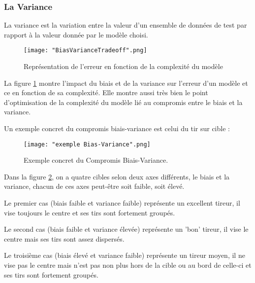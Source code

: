 \documentclass[a4paper]{article}
\begin{document}
\subsubsection{La Variance}

La variance est la variation entre la valeur d'un ensemble de données de test par rapport à la valeur donnée par le modèle choisi. 

\newpage

\begin{figure}[!h]
	\centering
	\texttt{[image: "BiasVarianceTradeoff".png]}
	\caption{Représentation de l'erreur en fonction de la complexité du modèle}
	\cite{BiasVarianceTradeoffTextbooksUpdate}
	\label{TradeoffRepresentation}
\end{figure}

La figure \ref{TradeoffRepresentation} montre l'impact du biais et de la variance sur l'erreur d'un modèle et ce en fonction de sa complexité. Elle montre aussi très bien le point d'optimisation de la complexité du modèle lié au compromis entre le biais et la variance.

\newpage

Un exemple concret du compromis biais-variance est celui du tir sur cible :

\begin{figure}[!h]
	\centering
	\texttt{[image: "exemple Bias-Variance".png]}
	\caption{Exemple concret du Compromis Biais-Variance.} \cite{UnderstandingBiasVarianceTradeoff}
	\label{ConcreteExample}
\end{figure}

Dans la figure \ref{ConcreteExample}, on a quatre cibles selon deux axes différents, le biais et la variance, chacun de ces axes peut-être soit faible, soit élevé. \par

Le premier cas (biais faible et variance faible) représente un excellent tireur, il vise toujours le centre et ses tirs sont fortement groupés. \par

Le second cas (biais faible et variance élevée) représente un 'bon' tireur, il vise le centre mais ses tirs sont assez dispersés. \par

Le troisième cas (biais élevé et variance faible) représente un tireur moyen, il ne vise pas le centre mais n'est pas non plus hors de la cible ou au bord de celle-ci et ses tirs sont fortement groupés. \par
\end{document}
